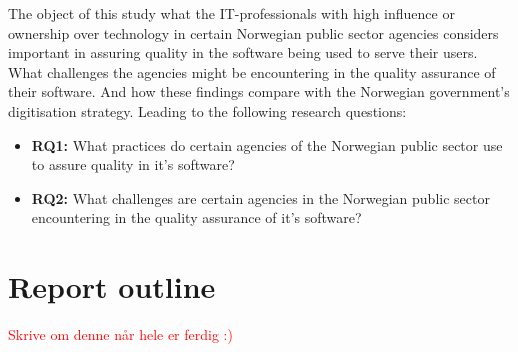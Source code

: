 


The object of this study what the IT-professionals with high influence or ownership over technology in certain Norwegian public sector agencies considers important in assuring quality in the software being used to serve their users. What challenges the agencies might be encountering in the quality assurance of their software. And how these findings compare with the Norwegian government's digitisation strategy. Leading to the following research questions:

\begin{itemize}
    \item \textbf{RQ1:} What practices do certain agencies of the Norwegian public sector use to assure quality in it's software?
    \item \textbf{RQ2:} What challenges are certain agencies in the Norwegian public sector encountering in the quality assurance of it's software?
\end{itemize}



\section{Report outline}

\textcolor{red}{Skrive om denne når hele er ferdig :)}